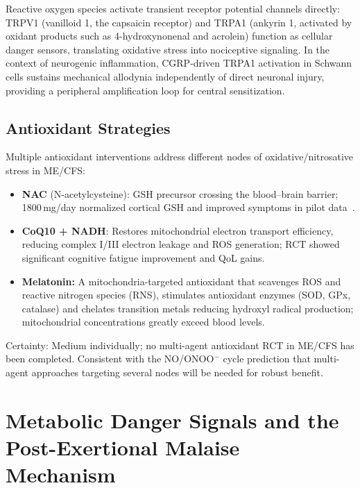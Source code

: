 Reactive oxygen species activate transient receptor potential channels directly: TRPV1 (vanilloid 1, the capsaicin receptor) and TRPA1 (ankyrin 1, activated by oxidant products such as 4-hydroxynonenal and acrolein) function as cellular danger sensors, translating oxidative stress into nociceptive signaling. In the context of neurogenic inflammation, CGRP-driven TRPA1 activation in Schwann cells sustains mechanical allodynia independently of direct neuronal injury, providing a peripheral amplification loop for central sensitization.

\subsection{Antioxidant Strategies}

\begin{hypothesis}
\label{hyp:ch15-antioxidants}
Multiple antioxidant interventions address different nodes of oxidative/nitrosative stress in ME/CFS:
\begin{itemize}
  \item \textbf{NAC} (N-acetylcysteine): GSH precursor crossing the blood--brain barrier; 1800\,mg/day normalized cortical GSH and improved symptoms in pilot data~\cite{Shungu2016NACtrial}.
  \item \textbf{CoQ10 + NADH}: Restores mitochondrial electron transport efficiency, reducing complex I/III electron leakage and ROS generation; RCT showed significant cognitive fatigue improvement and QoL gains.
  \item \textbf{Melatonin:} A mitochondria-targeted antioxidant that scavenges ROS and reactive nitrogen species (RNS), stimulates antioxidant enzymes (SOD, GPx, catalase) and chelates transition metals reducing hydroxyl radical production; mitochondrial concentrations greatly exceed blood levels.
\end{itemize}
Certainty: Medium individually; no multi-agent antioxidant RCT in ME/CFS has been completed. Consistent with the NO/ONOO$^-$ cycle prediction that multi-agent approaches targeting several nodes will be needed for robust benefit.
\end{hypothesis}


\section{Metabolic Danger Signals and the Post-Exertional Malaise Mechanism}
\label{sec:ch15-metabolic-danger}

